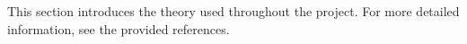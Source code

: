 This section introduces the theory used throughout the project. For more detailed information, see the provided references.




